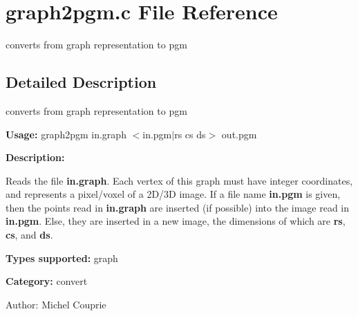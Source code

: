 \section{graph2pgm.c File Reference}
\label{graph2pgm_8c}
converts from graph representation to pgm  




\label{_details}
\subsection{Detailed Description}
converts from graph representation to pgm 

{\bf Usage:} graph2pgm in.graph $<$in.pgm$|$rs cs ds$>$ out.pgm

{\bf Description:}

Reads the file {\bf in.graph}. Each vertex of this graph must have integer coordinates, and represents a pixel/voxel of a 2D/3D image. If a file name {\bf in.pgm} is given, then the points read in {\bf in.graph} are inserted (if possible) into the image read in {\bf in.pgm}. Else, they are inserted in a new image, the dimensions of which are {\bf rs}, {\bf cs}, and {\bf ds}.

{\bf Types supported:} graph

{\bf Category:} convert

\begin{Desc}
\item[Author:]Michel Couprie \end{Desc}
